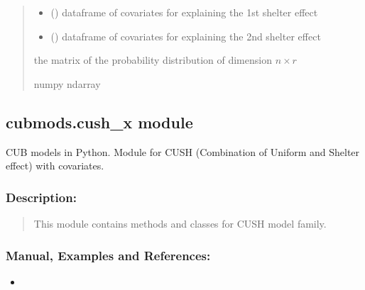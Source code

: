 \documentclass[letterpaper,10pt,english]{sphinxmanual}
\begin{document}
\begin{fulllineitems}
\begin{quote}
\begin{description}
\begin{itemize}
\item {} 
\sphinxAtStartPar
{} () \textendash{} dataframe of covariates for explaining the 1st shelter effect

\item {} 
\sphinxAtStartPar
{} () \textendash{} dataframe of covariates for explaining the 2nd shelter effect

\end{itemize}

\sphinxAtStartPar
the matrix of the probability distribution of dimension \(n \times r\)

\sphinxAtStartPar
numpy ndarray

\end{description}\end{quote}

\end{fulllineitems}



\subsection{cubmods.cush\_x module}
\label{\detokenize{cubmods:module-cubmods.cush_x}}\label{\detokenize{cubmods:cubmods-cush-x-module}}\label{\detokenize{cubmods:cushx-module}}
\sphinxAtStartPar
CUB models in Python.
Module for CUSH (Combination of Uniform
and Shelter effect) with covariates.


\subsubsection{Description:}
\label{\detokenize{cubmods:id63}}\begin{quote}

\sphinxAtStartPar
This module contains methods and classes
for CUSH model family.
\end{quote}


\subsubsection{Manual, Examples and References:}
\label{\detokenize{cubmods:id64}}\begin{itemize}
\item {} 
\sphinxAtStartPar
{}

\end{itemize}
\end{document}
